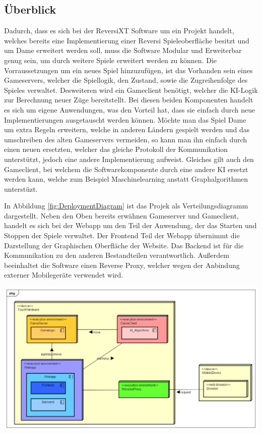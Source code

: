\documentclass[12pt,a4paper,bibliography=totocnumbered,listof=totocnumbered]{article}
\begin{document}
\subsection{Überblick}
Dadurch, dass es sich bei der ReversiXT Software um ein Projekt handelt, welches bereits eine Implementierung einer Reversi Spieleoberfläche besitzt und 
um Dame erweitert werden soll, muss die Software Modular und Erweiterbar genug sein, um durch weitere Spiele erweitert werden zu können.
Die Vorraussetzungen um ein neues Spiel hinzuzufügen, ist das Vorhanden sein eines Gameservers, welcher die Spiellogik, 
den Zustand, sowie die Zugreihenfolge des Spieles verwaltet. Desweiteren wird ein Gameclient benötigt, welcher die KI-Logik zur Berechnung
neuer Züge bereitstellt. Bei diesen beiden Komponenten handelt es sich um eigene Anwendungen, was den Vorteil hat, dass sie einfach 
durch neue Implementierungen ausgetauscht werden können. Möchte man das Spiel Dame um extra Regeln erweitern, welche in anderen Ländern gespielt werden
und das umschreiben des alten Gameservers vermeiden, so kann man ihn einfach durch einen neuen ersetzten, welcher das gleiche Protokoll der Kommunikation 
unterstützt, jedoch eine andere Implementierung aufweist. Gleiches gilt auch den Gameclient, bei welchem die Softwarekomponente durch 
eine andere KI ersetzt werden kann, welche zum Beispiel Maschinelearning anstatt Graphalgorithmen unterstüzt. 

In Abbildung \ref{fig:DeploymentDiagram} ist das Projek als Verteilungsdiagramm dargestellt. 
Neben den Oben bereits erwähnen Gameserver und Gameclient, handelt es sich bei der Webapp um den Teil der Anwendung, der das Starten und Stoppen der Spiele verwaltet.
Der Frontend Teil der Webapp übernimmt die Darstellung der Graphischen Oberfläche der Website. Das Backend ist für die Kommunikation zu den anderen 
Bestandteilen verantwortlich. Außerdem beeinhaltet die Software einen Reverse Proxy, welcher wegen der Anbindung externer Mobilegeräte verwendet wird.

\vspace{1em}
\begin{minipage}{\linewidth}
	\centering
	\includegraphics[width=1.0\linewidth]{pics/DeploymentDiagram.png}
	\label{fig:DeploymentDiagram}
\end{minipage}
\end{document}
